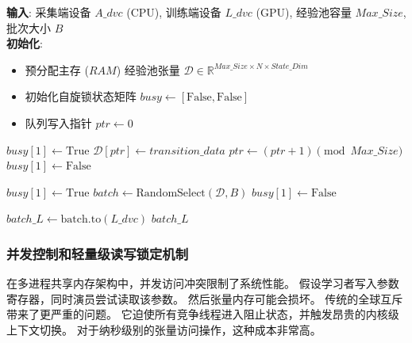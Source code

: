 \begin{algorithm}
\caption{共享数据中枢的异构张量流转与自旋锁控制伪代码}
\label{alg:shared_data}
\textbf{输入}: 采集端设备 $A\_dvc$ (CPU), 训练端设备 $L\_dvc$ (GPU), 经验池容量 $Max\_Size$, 批次大小 $B$\\
\textbf{初始化}: 
\begin{itemize}
    \vspace{-0.2cm}
    \item 预分配主存 ($RAM$) 经验池张量 $\mathcal{D} \in \mathbb{R}^{Max\_Size \times N \times State\_Dim}$
    \item 初始化自旋锁状态矩阵 $busy \leftarrow [\text{False}, \text{False}]$
    \item 队列写入指针 $ptr \leftarrow 0$
\end{itemize}
\vspace{-0.2cm}
\begin{algorithmic}[1]
 
     
        \State {} 
    \EndWhile
    \State $busy[1] \leftarrow \text{True}$ 
    \State $\mathcal{D}[ptr] \leftarrow transition\_data$ 
    \State $ptr \leftarrow (ptr + 1) \pmod{Max\_Size}$ 
    \State $busy[1] \leftarrow \text{False}$ 
\EndFunction

\State
{} 
        \State {} 
    \EndWhile
    \State $busy[1] \leftarrow \text{True}$
    \State $batch \leftarrow \text{RandomSelect}(\mathcal{D}, B)$ 
    \State $busy[1] \leftarrow \text{False}$
    
    \State $batch\_L \leftarrow \text{batch.to}(L\_dvc)$ 
    \State \Return $batch\_L$ 
\EndFunction
\end{algorithmic}
\end{algorithm}

\subsubsection{并发控制和轻量级读写锁定机制}

在多进程共享内存架构中，并发访问冲突限制了系统性能。 假设学习者写入参数寄存器，同时演员尝试读取该参数。 然后张量内存可能会损坏。 传统的全球互斥带来了更严重的问题。 它迫使所有竞争线程进入阻止状态，并触发昂贵的内核级上下文切换。 对于纳秒级别的张量访问操作，这种成本非常高。


